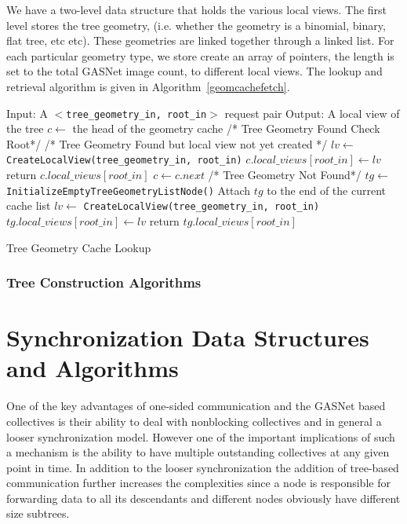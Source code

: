 \documentclass[times,10pt]{article}
\begin{document}
We have a two-level data structure that holds the various local views. The first level stores the tree geometry, (i.e. whether the geometry is a binomial, binary, flat tree, etc etc). These geometries are linked together through a linked list. For each particular geometry type, we store create an array of pointers, the length is set to the total GASNet image count, to different local views. The lookup and retrieval algorithm is given in Algorithm~\ref{geomcachefetch}.

\begin{algorithm}[h]
\begin{algorithmic}[1]
\STATE Input: A $<$\texttt{tree\_geometry\_in, root\_in}$>$ request pair
\STATE Output: A local view of the tree
\STATE $c \leftarrow$ the head of the geometry cache
 \STATE /* Tree Geometry Found Check Root*/
 \STATE /* Tree Geometry Found but local view not yet created */
 \STATE $lv \leftarrow$ \texttt{CreateLocalView(tree\_geometry\_in, root\_in)}
 \STATE $c.local\_views[root\_in] \leftarrow lv$
 \ENDIF
 \STATE return $c.local\_views[root\_in]$
 \ENDIF
 \STATE $c \leftarrow c.next$
\ENDWHILE
\STATE /* Tree Geometry Not Found*/
\STATE $tg \leftarrow$ \texttt{InitializeEmptyTreeGeometryListNode()}
\STATE Attach $tg$ to the end of the current cache list
\STATE $lv \leftarrow$ \texttt{CreateLocalView(tree\_geometry\_in, root\_in)}
 \STATE $tg.local\_views[root\_in] \leftarrow lv$
  \STATE return $tg.local\_views[root\_in]$
  \end{algorithmic}
\caption{Tree Geometry Cache Lookup }
\label{geomcachefetch}
\end{algorithm}


\subsubsection{Tree Construction Algorithms}

\section{Synchronization Data Structures and Algorithms}
One of the key advantages of one-sided communication and the GASNet based collectives is their ability to deal with nonblocking collectives and in general a looser synchronization model. However one of the important implications of such a mechanism is the ability to have multiple outstanding collectives at any given point in time. In addition to the looser synchronization the addition of tree-based communication further increases the complexities since a node is responsible for forwarding data to all its descendants and different nodes obviously have different size subtrees.
\end{document}
